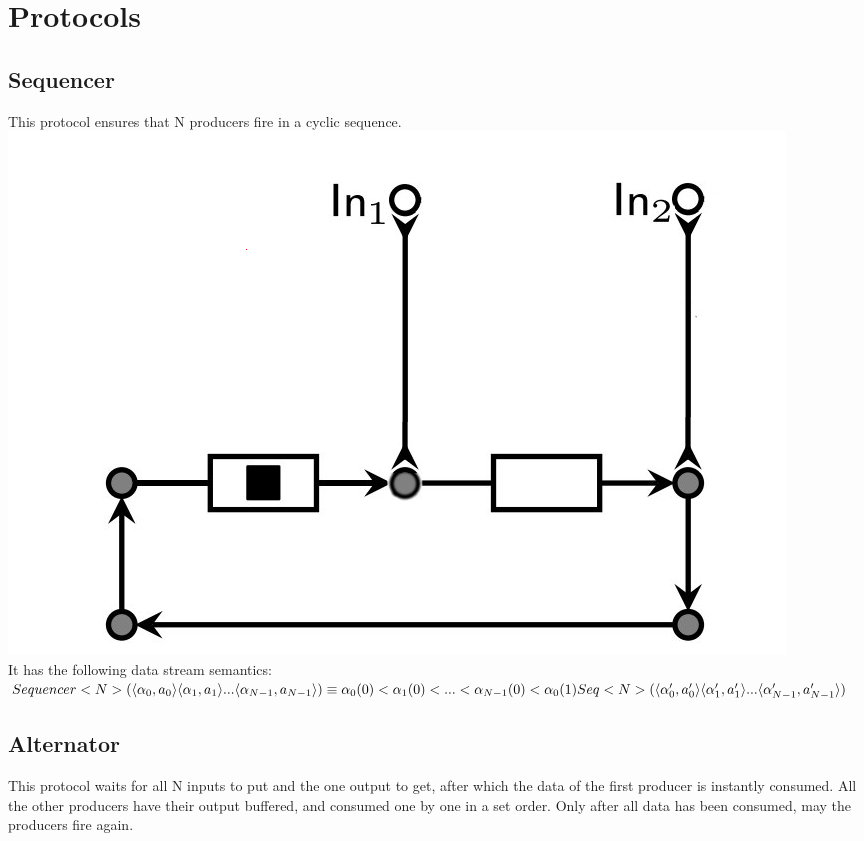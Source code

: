\section{Protocols}
\subsection{Sequencer}
This protocol ensures that N producers fire in a cyclic sequence.\\

\includegraphics[]{img/seq.png}\\

It has the following data stream semantics:\\
$
Sequencer<N>(\langle \alpha_0, a_0 \rangle \langle \alpha_1, a_1 \rangle... \langle \alpha_{N-1}, a_{N-1} \rangle) \equiv \\
\alpha_0(0) < \alpha_1(0) < ... < \alpha_{N-1}(0) < \alpha_0(1) \\
Seq<N>(\langle \alpha_0', a_0' \rangle \langle \alpha_1', a_1' \rangle... \langle \alpha_{N-1}', a_{N-1}' \rangle)
$


\subsection{Alternator}
This protocol waits for all N inputs to put and the one output to get, after which the data of the first producer is instantly consumed. All the other producers have their output buffered, and consumed one by one in a set order. Only after all data has been consumed, may the producers fire again.\\

